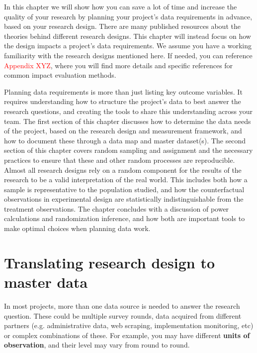 
\begin{fullwidth}

In this chapter we will show how you can save a lot of time
and increase the quality of your research by planning your project's data requirements
in advance, based on your research design.
There are many published resources about 
the theories behind different research designs.
This chapter will instead focus on how the design 
impacts a project's data requirements.
We assume you have a working familiarity
with the research designs mentioned here.
If needed, you can reference \textcolor{red}{Appendix XYZ},
where you will find more details 
and specific references for common impact evaluation methods.

Planning data requirements is more than just listing key outcome variables. 
It requires understanding how to structure the project's data to best answer the research questions, 
and creating the tools to share this understanding across your team.
The first section of this chapter discusses how to determine the data needs of the project, 
based on the research design and measurement framework, 
and how to document these through a data map and master dataset(s).
The second section of this chapter covers random sampling and assignment
and the necessary practices to ensure that 
these and other random processes are reproducible.
Almost all research designs rely on a random component 
for the results of the research to be a valid interpretation of the real world.
This includes both how a sample is representative to the population studied,
and how the counterfactual observations in experimental design are statistically indistinguishable
from the treatment observations.
The chapter concludes with a discussion of power calculations and randomization inference,
and how both are important tools to make optimal choices when planning data work.


\end{fullwidth}


\section{Translating research design to master data}

In most projects, more than one data source is needed to answer the research question.
These could be multiple survey rounds,
data acquired from different  partners (e.g. administrative data,
web scraping, implementation monitoring, etc)
or complex combinations of these.
For example, you may have different \textbf{units of observation},
and their level may vary from round to round.

